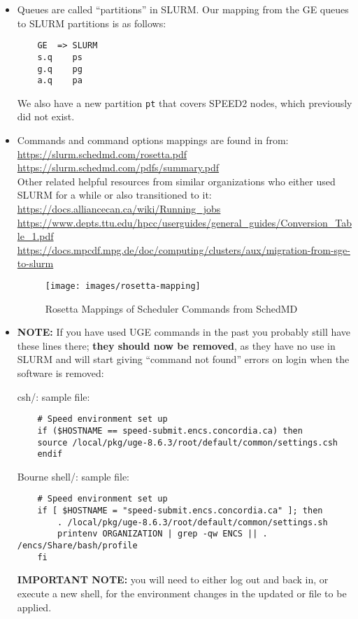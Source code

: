 \begin{itemize}
\item
Queues are called ``partitions'' in SLURM. Our mapping from the GE queues to SLURM partitions is as follows:
\begin{verbatim}
    GE  => SLURM
    s.q    ps
    g.q    pg
    a.q    pa
\end{verbatim}
We also have a new partition \texttt{pt} that covers SPEED2 nodes, which previously did not exist.

\item
Commands and command options mappings are found in  from:\\
\url{https://slurm.schedmd.com/rosetta.pdf}\\
\url{https://slurm.schedmd.com/pdfs/summary.pdf}\\
Other related helpful resources from similar organizations who either used SLURM for a while or also transitioned to it:\\
\url{https://docs.alliancecan.ca/wiki/Running_jobs}\\
\url{https://www.depts.ttu.edu/hpcc/userguides/general_guides/Conversion_Table_1.pdf}\\
\url{https://docs.mpcdf.mpg.de/doc/computing/clusters/aux/migration-from-sge-to-slurm}

\begin{figure}[htpb]
    \texttt{[image: images/rosetta-mapping]}
    \caption{Rosetta Mappings of Scheduler Commands from SchedMD}
    \label{fig:rosetta-mappings}
\end{figure}

\item
\textbf{NOTE:} If you have used UGE commands in the past you probably still have these
lines there; \textbf{they should now be removed}, as they have no use in SLURM and
will start giving ``command not found'' errors on login when the software is removed:

csh/: sample  file:
\scriptsize
\begin{verbatim}
    # Speed environment set up
    if ($HOSTNAME == speed-submit.encs.concordia.ca) then
    source /local/pkg/uge-8.6.3/root/default/common/settings.csh
    endif
\end{verbatim}
\normalsize
Bourne shell/: sample  file:
\scriptsize
\begin{verbatim}
    # Speed environment set up
    if [ $HOSTNAME = "speed-submit.encs.concordia.ca" ]; then
        . /local/pkg/uge-8.6.3/root/default/common/settings.sh
        printenv ORGANIZATION | grep -qw ENCS || . /encs/Share/bash/profile
    fi
\end{verbatim}
\normalsize

\textbf{IMPORTANT NOTE:} you will need to either log out and back in, or execute a new shell, 
for the environment changes in the updated  or  file to be applied.
\end{itemize}

